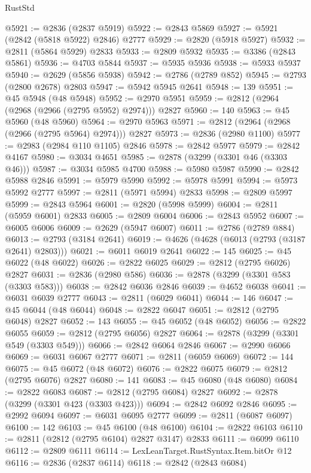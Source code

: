 \begin{lexlean}{RustStd}
\begin{coremodule}
@5921 := @2836 (@2837 @5919)
@5922 := @2843 @5869
@5927 := @5921 (@2842 (@5818 @5922) @2846) @2777
@5929 := @2820 (@5918 @5927)
@5932 := @2811 (@5864 @5929) @2833
@5933 := @2809 @5932
@5935 := @3386 (@2843 @5861)
@5936 := @4703 @5844
@5937 := @5935 @5936
@5938 := @5933 @5937
@5940 := @2629 (@5856 @5938)
@5942 := @2786 (@2789 @852)
@5945 := @2793 (@2800 @2678) @2803
@5947 := @5942 @5945 @2641
@5948 := 139
@5951 := @45 @5948 (@48 @5948)
@5952 := @2970 @5951
@5959 := @2812 (@2964 (@2968 (@2966 (@2795 @5952) @2974))) @2827
@5960 := 140
@5963 := @45 @5960 (@48 @5960)
@5964 := @2970 @5963
@5971 := @2812 (@2964 (@2968 (@2966 (@2795 @5964) @2974))) @2827
@5973 := @2836 (@2980 @1100)
@5977 := @2983 (@2984 @110 @1105) @2846
@5978 := @2842 @5977
@5979 := @2842 @4167
@5980 := @3034 @4651
@5985 := @2878 (@3299 (@3301 @46 (@3303 @46)))
@5987 := @3034 @5985 @4700
@5988 := @5980 @5987
@5990 := @2842 @5988 @2846
@5991 := @5979 @5990
@5992 := @5978 @5991
@5994 := @5973 @5992 @2777
@5997 := @2811 (@5971 @5994) @2833
@5998 := @2809 @5997
@5999 := @2843 @5964
@6001 := @2820 (@5998 @5999)
@6004 := @2811 (@5959 @6001) @2833
@6005 := @2809 @6004
@6006 := @2843 @5952
@6007 := @6005 @6006
@6009 := @2629 (@5947 @6007)
@6011 := @2786 (@2789 @884)
@6013 := @2793 (@3184 @2641)
@6019 := @4626 (@4628 (@6013 (@2793 (@3187 @2641) @2803)))
@6021 := @6011 @6019 @2641
@6022 := 145
@6025 := @45 @6022 (@48 @6022)
@6026 := @2822 @6025
@6029 := @2812 (@2795 @6026) @2827
@6031 := @2836 (@2980 @586)
@6036 := @2878 (@3299 (@3301 @583 (@3303 @583)))
@6038 := @2842 @6036 @2846
@6039 := @4652 @6038
@6041 := @6031 @6039 @2777
@6043 := @2811 (@6029 @6041)
@6044 := 146
@6047 := @45 @6044 (@48 @6044)
@6048 := @2822 @6047
@6051 := @2812 (@2795 @6048) @2827
@6052 := 143
@6055 := @45 @6052 (@48 @6052)
@6056 := @2822 @6055
@6059 := @2812 (@2795 @6056) @2827
@6064 := @2878 (@3299 (@3301 @549 (@3303 @549)))
@6066 := @2842 @6064 @2846
@6067 := @2990 @6066
@6069 := @6031 @6067 @2777
@6071 := @2811 (@6059 @6069)
@6072 := 144
@6075 := @45 @6072 (@48 @6072)
@6076 := @2822 @6075
@6079 := @2812 (@2795 @6076) @2827
@6080 := 141
@6083 := @45 @6080 (@48 @6080)
@6084 := @2822 @6083
@6087 := @2812 (@2795 @6084) @2827
@6092 := @2878 (@3299 (@3301 @423 (@3303 @423)))
@6094 := @2842 @6092 @2846
@6095 := @2992 @6094
@6097 := @6031 @6095 @2777
@6099 := @2811 (@6087 @6097)
@6100 := 142
@6103 := @45 @6100 (@48 @6100)
@6104 := @2822 @6103
@6110 := @2811 (@2812 (@2795 @6104) @2827 @3147) @2833
@6111 := @6099 @6110
@6112 := @2809 @6111
@6114 := LexLeanTarget.RustSyntax.Item.bitOr @12
@6116 := @2836 (@2837 @6114)
@6118 := @2842 (@2843 @6084)

\end{coremodule}
\end{lexlean}
